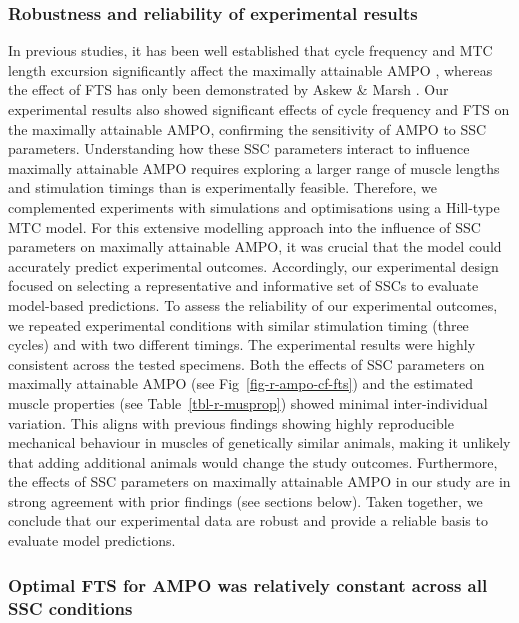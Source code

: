 \documentclass[
  10pt,
  letterpaper,
]{article}
\begin{document}
\subsubsection{Robustness and reliability of experimental
results}\label{robustness-and-reliability-of-experimental-results}

In previous studies, it has been well established that cycle frequency
and MTC length excursion significantly affect the maximally attainable
AMPO
\citep[e.g.][]{altringham_modelling_1990, askew_effects_1997, askew_optimal_1998, caiozzo_determinants_1997, james_mechanical_1995, james_isometric_1996},
whereas the effect of FTS has only been demonstrated by Askew \& Marsh
{\citep{askew_effects_1997, askew_optimal_1998}}. Our experimental
results also showed significant effects of cycle frequency and FTS on
the maximally attainable AMPO, confirming the sensitivity of AMPO to SSC
parameters. Understanding how these SSC parameters interact to influence
maximally attainable AMPO requires exploring a larger range of muscle
lengths and stimulation timings than is experimentally feasible.
Therefore, we complemented experiments with simulations and
optimisations using a Hill-type MTC model. For this extensive modelling
approach into the influence of SSC parameters on maximally attainable
AMPO, it was crucial that the model could accurately predict
experimental outcomes. Accordingly, our experimental design focused on
selecting a representative and informative set of SSCs to evaluate
model-based predictions. To assess the reliability of our experimental
outcomes, we repeated experimental conditions with similar stimulation
timing (three cycles) and with two different timings. The experimental
results were highly consistent across the tested specimens. Both the
effects of SSC parameters on maximally attainable AMPO (see
Fig~\ref{fig-r-ampo-cf-fts}) and the estimated muscle properties (see
Table~\ref{tbl-r-musprop}) showed minimal inter-individual variation.
This aligns with previous findings showing highly reproducible
mechanical behaviour in muscles of genetically similar animals, making
it unlikely that adding additional animals would change the study
outcomes. Furthermore, the effects of SSC parameters on maximally
attainable AMPO in our study are in strong agreement with prior findings
(see sections below). Taken together, we conclude that our experimental
data are robust and provide a reliable basis to evaluate model
predictions.

\subsubsection{Optimal FTS for AMPO was relatively constant across all
SSC
conditions}\label{optimal-fts-for-ampo-was-relatively-constant-across-all-ssc-conditions}
\end{document}
